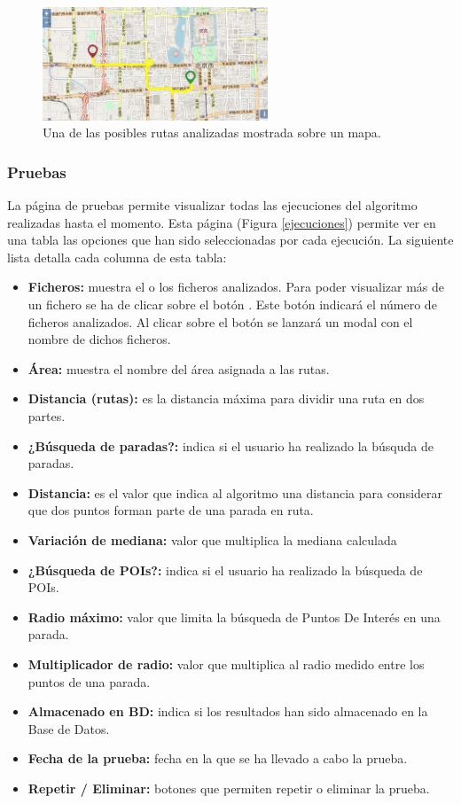 \begin{figure}[h]
  \centering
    \includegraphics[width=0.6\textwidth]{../img/manualusuario/rutaanalizada.jpg}
  \caption{Una de las posibles rutas analizadas mostrada sobre un mapa.}
  \label{rutaanalizada}
\end{figure}


\subsubsection{Pruebas}
La página de pruebas permite visualizar todas las ejecuciones del algoritmo realizadas hasta el momento. Esta página (Figura \ref{ejecuciones}) permite ver en una tabla las opciones que han sido seleccionadas por cada ejecución. La siguiente lista detalla cada columna de esta tabla:

\begin{itemize}
	\item \textbf{Ficheros:} muestra el o los ficheros analizados. Para poder visualizar más de un fichero se ha de clicar sobre el botón . Este botón indicará el número de ficheros analizados. Al clicar sobre el botón se lanzará un modal con el nombre de dichos ficheros.
	\item \textbf{Área:} muestra el nombre del área asignada a las rutas.
	\item \textbf{Distancia (rutas):} es la distancia máxima para dividir una ruta en dos partes.
	\item \textbf{¿Búsqueda de paradas?:} indica si el usuario ha realizado la búsquda de paradas.
	\item \textbf{Distancia:} es el valor que indica al algoritmo una distancia para considerar que dos puntos forman parte de una parada en ruta.
	\item \textbf{Variación de mediana:} valor que multiplica la mediana calculada
	\item \textbf{¿Búsqueda de POIs?:} indica si el usuario ha realizado la búsqueda de POIs.
	\item \textbf{Radio máximo:} valor que limita la búsqueda de Puntos De Interés en una parada.
	\item \textbf{Multiplicador de radio:} valor que multiplica al radio medido entre los puntos de una parada.
	\item \textbf{Almacenado en BD:} indica si los resultados han sido almacenado en la Base de Datos.
	\item \textbf{Fecha de la prueba:} fecha en la que se ha llevado a cabo la prueba.
	\item \textbf{Repetir / Eliminar:} botones que permiten repetir o eliminar la prueba.
\end{itemize}

